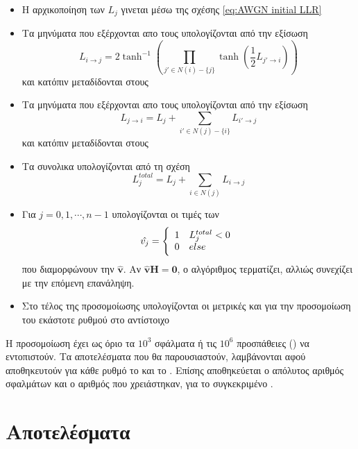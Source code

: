 \begin{itemize}
\item Η αρχικοποίηση των $L_j$ γινεται μέσω της σχέσης \ref{eq:AWGN initial LLR}
\item Τα μηνύματα που εξέρχονται απο τους  υπολογίζονται από την εξίσωση 
\begin{equation}
L_{i\to j} = 2\tanh^{-1} \left( \prod_{j'\in N(i)-\lbrace j\rbrace} \tanh \left( \frac{1}{2}L_{j'\to i} \right)\right)
\end{equation}
και κατόπιν μεταδίδονται στους 
\item Τα μηνύματα που εξέρχονται απο τους  υπολογίζονται από την εξίσωση
\begin{equation*}
L_{j\to i} = L_j + \sum_{i'\in N(j)-\lbrace i\rbrace} L_{i'\to j}
\end{equation*}
και κατόπιν μεταδίδονται στους 
\item Τα συνολικα  υπολογίζονται από τη σχέση
\begin{equation*}
L_{j}^{total} = L_j + \sum_{i\in N(j)} L_{i\to j}
\end{equation*}
\item Για $j=0,1,\cdots,n-1$ υπολογίζονται οι τιμές των 
\begin{equation*}
\hat{v_j}=\left\{
\begin{array}{c l}	
     1 & L_{j}^{total}<0\\
     0 & else
\end{array}\right.
\end{equation*}
που διαμορφώνουν την $\hat{\mathbf{v}}$. Αν $\hat{\mathbf{v}}\mathbf{Η}=\mathbf{0}$, ο αλγόριθμος τερματίζει, αλλιώς συνεχίζει με την επόμενη επανάληψη.
\item Στο τέλος της προσομοίωσης υπολογίζονται οι μετρικές  και  για την προσομοίωση του εκάστοτε ρυθμού στο αντίστοιχο 
\end{itemize}


Η προσομοίωση έχει ως όριο τα $10^3$ σφάλματα ή τις $10^6$ προσπάθειες () να εντοπιστούν. Τα αποτελέσματα που θα παρουσιαστούν, λαμβάνονται αφού αποθηκευτούν για κάθε ρυθμό το  και το . Επίσης αποθηκεύεται ο απόλυτος αριθμός σφαλμάτων και ο αριθμός  που χρειάστηκαν, για το συγκεκριμένο .

\section{Αποτελέσματα}

